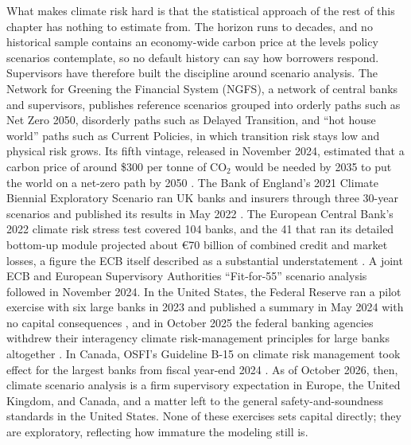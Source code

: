 \documentclass[../ai_in_finance]{subfiles}
\begin{document}
What makes climate risk hard is that the statistical approach of the rest of this chapter has nothing to estimate from. The horizon runs to decades, and no historical sample contains an economy-wide carbon price at the levels policy scenarios contemplate, so no default history can say how borrowers respond. Supervisors have therefore built the discipline around scenario analysis. The Network for Greening the Financial System (NGFS), a network of central banks and supervisors, publishes reference scenarios grouped into orderly paths such as Net Zero 2050, disorderly paths such as Delayed Transition, and ``hot house world'' paths such as Current Policies, in which transition risk stays low and physical risk grows. Its fifth vintage, released in November 2024, estimated that a carbon price of around \$300 per tonne of CO$_2$ would be needed by 2035 to put the world on a net-zero path by 2050 \parencite{ngfs2024scenarios}. The Bank of England's 2021 Climate Biennial Exploratory Scenario ran UK banks and insurers through three 30-year scenarios and published its results in May 2022 \parencite{boe2022cbes}. The European Central Bank's 2022 climate risk stress test covered 104 banks, and the 41 that ran its detailed bottom-up module projected about \euro70 billion of combined credit and market losses, a figure the ECB itself described as a substantial understatement \parencite{ecb2022climate}. A joint ECB and European Supervisory Authorities ``Fit-for-55'' scenario analysis followed in November 2024. In the United States, the Federal Reserve ran a pilot exercise with six large banks in 2023 and published a summary in May 2024 with no capital consequences \parencite{fed2024pilot}, and in October 2025 the federal banking agencies withdrew their interagency climate risk-management principles for large banks altogether \parencite{fed2025climate}. In Canada, OSFI's Guideline B-15 on climate risk management took effect for the largest banks from fiscal year-end 2024 \parencite{osfi2023b15}. As of October 2026, then, climate scenario analysis is a firm supervisory expectation in Europe, the United Kingdom, and Canada, and a matter left to the general safety-and-soundness standards in the United States. None of these exercises sets capital directly; they are exploratory, reflecting how immature the modeling still is.
\end{document}
